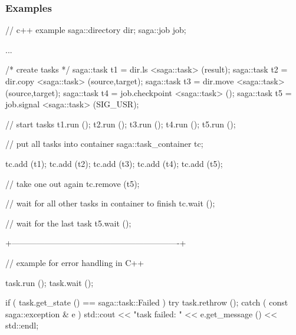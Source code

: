  
 \subsubsection{Examples}
 
 \begin{mycode}
  // c++ example
  saga::directory dir;
  saga::job       job;
 
  ...
 
  /* create tasks */
  saga::task t1 = dir.ls         <saga::task> (result);
  saga::task t2 = dir.copy       <saga::task> (source,target);
  saga::task t3 = dir.move       <saga::task> (source,target);
  saga::task t4 = job.checkpoint <saga::task> ();
  saga::task t5 = job.signal     <saga::task> (SIG_USR);
 
  // start tasks
  t1.run ();
  t2.run ();
  t3.run ();
  t4.run ();
  t5.run ();
 
  // put all tasks into container
  saga::task_container tc;
 
  tc.add (t1);
  tc.add (t2);
  tc.add (t3);
  tc.add (t4);
  tc.add (t5);
 
  // take one out again
  tc.remove (t5);
 
  // wait for all other tasks in container to finish
  tc.wait ();
 
  // wait for the last task
  t5.wait ();
 
  +-------------------------------------------------------------+
 
  // example for error handling in C++
  {
    task.run  ();
    task.wait ();
 
    if ( task.get_state () == saga::task::Failed )
    {
      try {
        task.rethrow ();
      }
      catch ( const saga::exception & e )
      {
        std::cout << "task failed: " 
                  << e.get_message () 
                  << std::endl;
      }
    }
  }
 \end{mycode}
 
